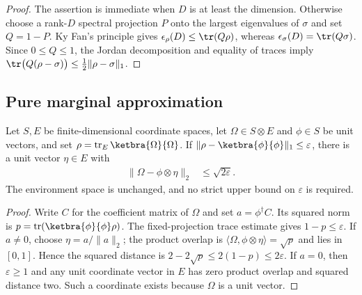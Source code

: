 \begin{proof}\leanok
  The assertion is immediate when $D$ is at least the dimension.
  Otherwise choose a rank-$D$ spectral projection $P$ onto the largest
  eigenvalues of $\sigma$ and set $Q=1-P$. Ky Fan's principle gives
  $\epsilon_\rho(D)\le\tr(Q\rho)$, whereas
  $\epsilon_\sigma(D)=\tr(Q\sigma)$. Since $0\le Q\le1$, the Jordan
  decomposition and equality of traces imply
  $\tr\bigl(Q(\rho-\sigma)\bigr)\le\frac12\lVert\rho-\sigma\rVert_1$.
\end{proof}

\subsection{Pure marginal approximation}

\begin{theorem}
    \label{thm:pure_marginal_product_approximation}
    \notready
    Let $S,E$ be finite-dimensional coordinate spaces, let
    $\Omega\in S\otimes E$ and $\phi\in S$ be unit vectors, and set
    $\rho=\operatorname{tr}_E\ketbra{\Omega}{\Omega}$.
    If $\|\rho-\ketbra{\phi}{\phi}\|_1\le\varepsilon$, there is a unit
    vector $\eta\in E$ with
    \begin{align}
        \|\Omega-\phi\otimes\eta\|_2 & \le\sqrt{2\varepsilon}.
        \label{eq:pure_marginal_product_approximation}
    \end{align}
    The environment space is unchanged, and no strict upper bound on
    $\varepsilon$ is required.
\end{theorem}
\begin{proof}
    \notready
    Write $C$ for the coefficient matrix of $\Omega$ and set
    $a=\phi^\dagger C$. Its squared norm is
    $p=\operatorname{tr}(\ketbra{\phi}{\phi}\rho)$.
    The fixed-projection trace estimate gives $1-p\le\varepsilon$.
    If $a\ne0$, choose $\eta=a/\|a\|_2$; the product overlap is
    $\langle\Omega,\phi\otimes\eta\rangle=\sqrt p$ and lies in $[0,1]$.
    Hence the squared distance is $2-2\sqrt p\le2(1-p)\le2\varepsilon$.
    If $a=0$, then $\varepsilon\ge1$ and any unit coordinate vector in
    $E$ has zero product overlap and squared distance two. Such a coordinate
    exists because $\Omega$ is a unit vector.
\end{proof}
